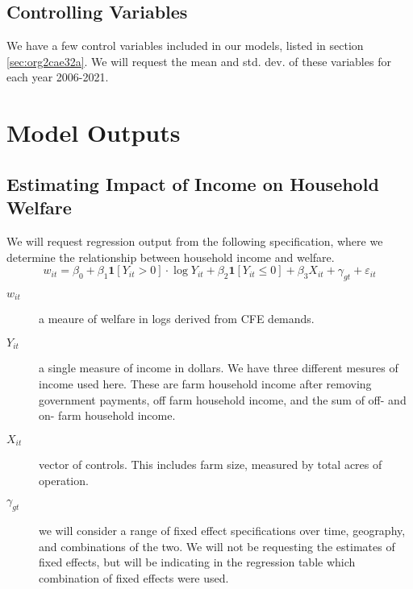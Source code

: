 \documentclass[11pt]{article}
\begin{document}
\subsection{Controlling Variables}
\label{sec:org1bfb875}
We have a few control variables included in our models, listed in section \ref{sec:org2cae32a}. We will request the mean and std. dev. of these variables for each year 2006-2021. 
\section{Model Outputs}
\label{sec:orga8b80af}
\subsection{Estimating Impact of Income on Household Welfare}
\label{sec:org393bd03}
We will request regression output from the following specification, where we determine the relationship between household income and welfare.
\[
w_{it} = \beta_{0} + \beta_{1}\mathbf{1}[Y_{it} >  0] \cdot \log{Y_{it}} + \beta_{2}\mathbf{1}[Y_{it} \leq 0 ] + \beta_{3} X_{it} + \gamma_{gt} + \varepsilon_{it}
\]

\begin{description}
\item[{\(w_{it}\)}] a meaure of welfare in logs derived from CFE demands.
\item[{\(Y_{it}\)}] a single measure of income in dollars. We have three different mesures of income used here. These are farm household income after removing government payments, off farm household income, and the sum of off- and on- farm household income.
\item[{\(X_{it}\)}] vector of controls. This includes farm size, measured by total acres of operation.
\item[{\(\gamma_{gt}\)}] we will consider a range of fixed effect specifications over time, geography, and combinations of the two. We will not be requesting the estimates of fixed effects, but will be indicating in the regression table which combination of fixed effects were used.
\end{description}
\end{document}
